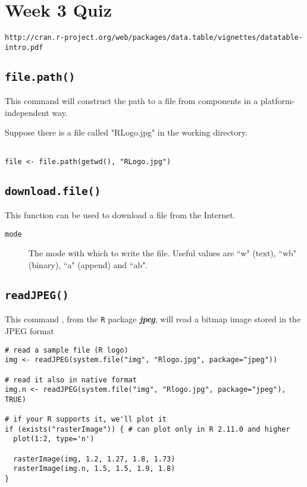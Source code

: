 \documentclass[]{article}
\begin{document}
\section{Week 3 Quiz}

\begin{verbatim}
http://cran.r-project.org/web/packages/data.table/vignettes/datatable-intro.pdf
\end{verbatim}

\subsection*{\texttt{file.path()}}

This command will construct the path to a file from components in a platform-independent way. 

Suppose there is a file called "RLogo.jpg" in the working directory.
\begin{framed}
\begin{verbatim}

file <- file.path(getwd(), "RLogo.jpg")

\end{verbatim}
\end{framed}
\subsection*{\texttt{download.file()}}

This function can be used to download a file from the Internet. 

\begin{description}
\item[\texttt{mode}] The mode with which to write the file. Useful values are ``w" (text), ``wb" (binary), ``a" (append) and ``ab".
\end{description}

\subsection*{\texttt{readJPEG()}}

This command , from the \texttt{R} package \textbf{\textit{jpeg}}, will read a bitmap image stored in the JPEG format 
\begin{framed}
\begin{verbatim}
# read a sample file (R logo)
img <- readJPEG(system.file("img", "Rlogo.jpg", package="jpeg"))
 
# read it also in native format
img.n <- readJPEG(system.file("img", "Rlogo.jpg", package="jpeg"), TRUE)
 
# if your R supports it, we'll plot it
if (exists("rasterImage")) { # can plot only in R 2.11.0 and higher
  plot(1:2, type='n')
 
  rasterImage(img, 1.2, 1.27, 1.8, 1.73)
  rasterImage(img.n, 1.5, 1.5, 1.9, 1.8)
}
\end{verbatim}
\end{framed}
\end{document}
